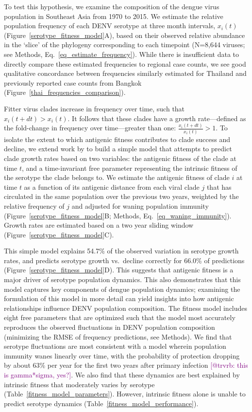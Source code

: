\documentclass[11pt,oneside,letterpaper]{article}
\def\sbc#1{\textcolor{purple}{[#1]}}
\begin{document}
To test this hypothesis, we examine the composition of the dengue virus population in Southeast Asia from 1970 to 2015.
We estimate the relative population frequency of each DENV serotype at three month intervals, $x_i(t)$ (Figure~\ref{serotype_fitness_model}A), based on their observed relative abundance in the `slice' of the phylogeny corresponding to each timepoint (N=8,644 viruses; see Methods, Eq.~\ref{eq_estimate_frequency}).
While there is insufficient data to directly compare these estimated frequencies to regional case counts, we see good qualitative concordance between frequencies similarly estimated for Thailand and previously reported case counts from Bangkok (Figure~\ref{thai_frequencies_comparison}).

Fitter virus clades increase in frequency over time, such that $x_i(t+dt) > x_i(t)$.
It follows that these clades have a growth rate---defined as the fold-change in frequency over time---greater than one: $\frac{x_i(t+dt)}{x_i(t)} > 1$.
To isolate the extent to which antigenic fitness contributes to clade success and decline, we extend work by \citet{luksza2014predictive} to build a simple model that attempts to predict clade growth rates based on two variables: the antigenic fitness of the clade at time $t$, and a time-invariant free parameter representing the intrinsic fitness of the serotype the clade belongs to.
We estimate the antigenic fitness of clade $i$ at time $t$ as a function of its antigenic distance from each viral clade $j$ that has circulated in the same population over the previous two years, weighted by the relative frequency of $j$ and adjusted for waning population immunity (Figure~\ref{serotype_fitness_model}B; Methods, Eq.~\ref{eq_waning_immunity}).
Growth rates are estimated based on a two year sliding window (Figure~\ref{serotype_fitness_model}C).

This simple model explains 54.7\% of the observed variation in serotype growth rates, and predicts serotype growth vs.\ decline correctly for 66.0\% of predictions (Figure~\ref{serotype_fitness_model}D).
This suggests that antigenic fitness is a major driver of serotype population dynamics.
This also demonstrates that this model captures key components of dengue population dynamics; examining the formulation of this model in more detail can yield insights into how antigenic relationships influence DENV population composition.
The fitness model includes eight free parameters that are optimized such that the model most accurately reproduces the observed fluctuations in DENV population composition (minimizing the RMSE of frequency predictions, see Methods).
We find that serotype fluctuations are most consistent with a model wherein population immunity wanes linearly over time, with the probability of protection dropping by about 63\% per year for the first two years after primary infection \sbc{@trvrb: this is gamma*sigma, yes?}.
We also find that these dynamics are best explained by intrinsic fitness that moderately varies by serotype (Table~\ref{fitness_model_parameters}).
However, intrinsic fitness alone is unable to predict serotype dynamics (Table~\ref{fitness_model_performance}).
\end{document}
